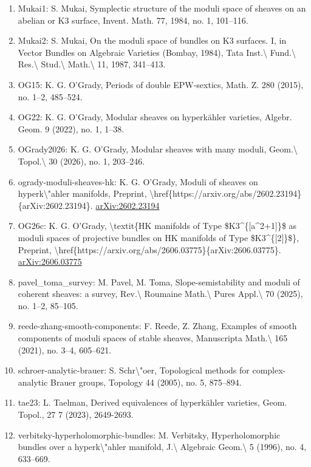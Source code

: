 \documentclass[11pt]{article}
\begin{document}
\begin{enumerate}[leftmargin=*]
  \item Mukai1: S. Mukai, Symplectic structure of the moduli space of sheaves on an abelian or K3 surface, Invent. Math. 77, 1984, no. 1, 101--116.
  \item Mukai2: S. Mukai, On the moduli space of bundles on K3 surfaces. I, in Vector Bundles on Algebraic Varieties (Bombay, 1984), Tata Inst.\textbackslash{} Fund.\textbackslash{} Res.\textbackslash{} Stud.\textbackslash{} Math.\textbackslash{} 11, 1987, 341--413.
  \item OG15: K. G. O'Grady, Periods of double EPW-sextics, Math. Z. 280 (2015), no. 1--2, 485--524.
  \item OG22: K. G. O'Grady, Modular sheaves on hyperkähler varieties, Algebr. Geom. 9 (2022), no. 1, 1--38.
  \item OGrady2026: K. G. O'Grady, Modular sheaves with many moduli, Geom.\textbackslash{} Topol.\textbackslash{} 30 (2026), no. 1, 203--246.
  \item ogrady-moduli-sheaves-hk: K. G. O'Grady, Moduli of sheaves on hyperk\textbackslash{}"ahler manifolds, Preprint, \textbackslash{}href\{https://arxiv.org/abs/2602.23194\}\{arXiv:2602.23194\}. \href{https://arxiv.org/abs/2602.23194}{arXiv:2602.23194}
  \item OG26c: K. G. O'Grady, \textbackslash{}textit\{HK manifolds of Type \$K3\^{}\{[a\^{}2+1]\}\$ as moduli spaces of projective bundles on HK manifolds of Type \$K3\^{}\{[2]\}\$\}, Preprint, \textbackslash{}href\{https://arxiv.org/abs/2606.03775\}\{arXiv:2606.03775\}. \href{https://arxiv.org/abs/2606.03775}{arXiv:2606.03775}
  \item pavel\_toma\_survey: M. Pavel, M. Toma, Slope-semistability and moduli of coherent sheaves: a survey, Rev.\textbackslash{} Roumaine Math.\textbackslash{} Pures Appl.\textbackslash{} 70 (2025), no. 1--2, 85--105.
  \item reede-zhang-smooth-components: F. Reede, Z. Zhang, Examples of smooth components of moduli spaces of stable sheaves, Manuscripta Math.\textbackslash{} 165 (2021), no. 3--4, 605--621.
  \item schroer-analytic-brauer: S. Schr\textbackslash{}"oer, Topological methods for complex-analytic Brauer groups, Topology 44 (2005), no. 5, 875--894.
  \item tae23: L. Taelman, Derived equivalences of hyperkähler varieties, Geom. Topol., 27 7 (2023), 2649-2693.
  \item verbitsky-hyperholomorphic-bundles: M. Verbitsky, Hyperholomorphic bundles over a hyperk\textbackslash{}"ahler manifold, J.\textbackslash{} Algebraic Geom.\textbackslash{} 5 (1996), no. 4, 633--669.

\end{enumerate}
\end{document}
